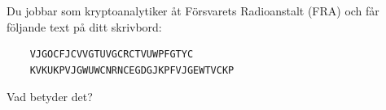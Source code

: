\begin{exercise}
  Du jobbar som kryptoanalytiker åt Försvarets Radioanstalt (FRA) och får 
  följande text på ditt skrivbord:
	\begin{verbatim}
    VJGOCFJCVVGTUVGCRCTVUWPFGTYC
    KVKUKPVJGWUWCNRNCEGDGJKPFVJGEWTVCKP
  \end{verbatim}

	Vad betyder det?

\end{exercise}
